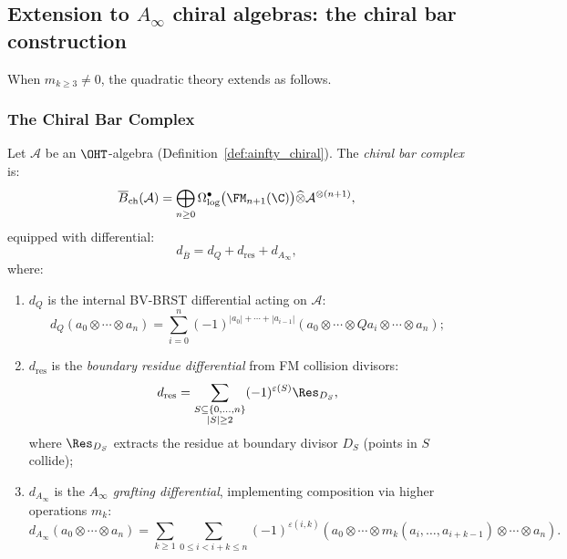 \subsection{Extension to $A_\infty$ chiral algebras: the chiral bar construction}

When $m_{k \geq 3} \neq 0$, the quadratic theory extends as follows.

\subsubsection{The Chiral Bar Complex}

\begin{definition}
\label{def:chiral_bar}
Let $\mathcal{A}$ be an $\OHT$-algebra (Definition~\ref{def:ainfty_chiral}). The \emph{chiral bar complex} is:
\begin{equation}
\overline{B}_{\text{ch}}(\mathcal{A}) = \bigoplus_{n \geq 0} \Omega^\bullet_{\log}\big(\FM_{n+1}(\C)\big) \widehat{\otimes} \mathcal{A}^{\otimes (n+1)},
\end{equation}
equipped with differential:
\begin{equation}
d_{\overline{B}} = d_Q + d_{\text{res}} + d_{A_\infty},
\end{equation}
where:
\begin{enumerate}[label=(\roman*)]
\item $d_Q$ is the internal BV-BRST differential acting on $\mathcal{A}$:
\begin{equation}
d_Q(a_0 \otimes \cdots \otimes a_n) = \sum_{i=0}^n (-1)^{|a_0| + \cdots + |a_{i-1}|} (a_0 \otimes \cdots \otimes Qa_i \otimes \cdots \otimes a_n);
\end{equation}

\item $d_{\text{res}}$ is the \emph{boundary residue differential} from FM collision divisors:
\begin{equation}
d_{\text{res}} = \sum_{\substack{S \subseteq \{0, \ldots, n\} \\ |S| \geq 2}} (-1)^{\varepsilon(S)} \Res_{D_S},
\end{equation}
where $\Res_{D_S}$ extracts the residue at boundary divisor $D_S$ (points in $S$ collide);

\item $d_{A_\infty}$ is the \emph{$A_\infty$ grafting differential}, implementing composition via higher operations $m_k$:
\begin{equation}
d_{A_\infty}(a_0 \otimes \cdots \otimes a_n) = \sum_{k \geq 1} \sum_{0 \leq i < i+k \leq n} (-1)^{\varepsilon(i,k)} (a_0 \otimes \cdots \otimes m_k(a_i, \ldots, a_{i+k-1}) \otimes \cdots \otimes a_n).
\end{equation}
\end{enumerate}
\end{definition}

